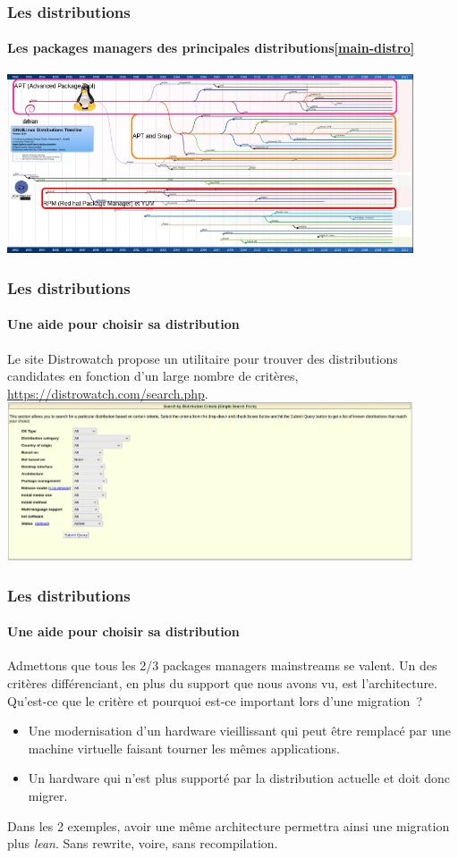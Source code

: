 \documentclass{beamer}
\begin{document}
    \begin{frame}
        \transdissolve
        \frametitle{Les distributions}
        \framesubtitle{Les packages managers des principales distributions\cref{main-distro}}
        \centering
        \includegraphics[width=12cm]{image/main-distro-package-manager.drawio}
    \end{frame}

    \begin{frame}
        \transdissolve
        \frametitle{Les distributions}
        \framesubtitle{Une aide pour choisir sa distribution}
        Le site Distrowatch propose un utilitaire pour trouver des distributions candidates en fonction d'un large nombre de critères, \url{https://distrowatch.com/search.php}.
        \bigbreak
        \centering
        \includegraphics[width=12cm]{image/distrowatch-search}
    \end{frame}

    \begin{frame}
        \transdissolve
        \frametitle{Les distributions}
        \framesubtitle{Une aide pour choisir sa distribution}
        Admettons que tous les 2/3 packages managers mainstreams se valent.
        \bigbreak
        Un des critères différenciant, en plus du support que nous avons vu, est l'architecture.
        \bigbreak
        Qu'est-ce que le critère  et pourquoi est-ce important lors d'une migration~?
        \pause
        \bigbreak
        \begin{itemize}
            \item Une modernisation d'un hardware vieillissant qui peut être remplacé par une machine virtuelle faisant tourner les mêmes applications.
            \item Un hardware qui n'est plus supporté par la distribution actuelle et doit donc migrer.
        \end{itemize}
        Dans les 2 exemples, avoir une même architecture permettra ainsi une migration plus \textit{lean}.
        Sans rewrite, voire, sans recompilation.
    \end{frame}
\end{document}
